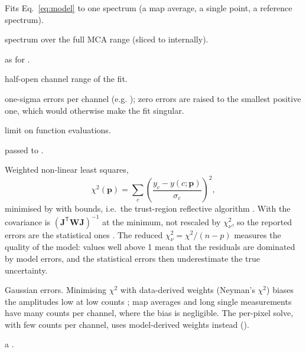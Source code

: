 Fits Eq.~\eqref{eq:model} to one spectrum (a map average, a single point, a reference
spectrum).
\begin{args}
\item[y] spectrum over the full MCA range (sliced to  internally).
\item[groups, calibration, detector] as for .
\item[roi] half-open channel range of the fit.
\item[yerr] one-sigma errors per channel (e.g. ); zero errors are raised to
  the smallest positive one, which would otherwise make the fit singular.
\item[maxfev] limit on function evaluations.
\item[others] passed to .
\end{args}
 Weighted non-linear least squares,
\begin{equation}
  \chi^2(\mathbf p) = \sum_c \left(\frac{y_c - y(c;\mathbf p)}{\sigma_c}\right)^2,
\end{equation}
minimised by  with bounds, i.e.\ the trust-region reflective
algorithm \citep{Branch1999,Virtanen2020}. With  the covariance is
$(\mathbf J^\mathsf T\mathbf W\mathbf J)^{-1}$ at the minimum, not rescaled by $\chi^2_\nu$, so
the reported errors are the statistical ones \citep{Bevington2003}. The reduced
$\chi^2_\nu = \chi^2/(n-p)$ measures the quality of the model: values well above 1 mean that
the residuals are dominated by model errors, and the statistical errors then underestimate
the true uncertainty.
\begin{hyp}
Gaussian errors. Minimising $\chi^2$ with data-derived weights (Neyman's $\chi^2$) biases
the amplitudes low at low counts \citep{Baker1984,Mighell1999}; map averages and long single
measurements have many counts per channel, where the bias is negligible. The per-pixel solve,
with few counts per channel, uses model-derived weights instead ().
\end{hyp}
 a .

